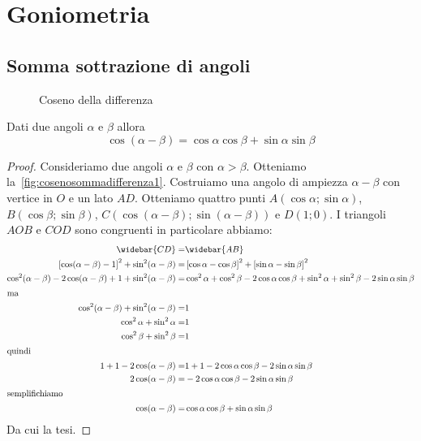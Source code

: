 \chapter{Goniometria}
\section{Somma sottrazione di angoli}
\begin{figure}
	\centering

	\caption{Coseno della differenza}
	\label{fig:cosenosommadifferenza1}
\end{figure}
\begin{thm}\label{thm:Cosenodelladifferenza}
Dati due angoli $\alpha$ e $\beta$ allora
\[\cos(\alpha-\beta)=\cos\alpha\cos\beta+\sin\alpha\sin\beta  \]
\end{thm}
\begin{proof}
Consideriamo due angoli $\alpha$ e $\beta$ con $\alpha>\beta$. Otteniamo la~\vref{fig:cosenosommadifferenza1}. Costruiamo una angolo di ampiezza $\alpha-\beta$ con vertice in $O$ e un lato $AD$. Otteniamo quattro punti $A(\cos\alpha;\sin\alpha)$, $B (\cos\beta;\sin\beta)$, $C(\cos\left(\alpha-\beta\right);\sin\left(\alpha-\beta\right))$ e $D(1;0)$. I triangoli $AOB$ e $COD$ sono congruenti in particolare abbiamo: \begin{align*}
\widebar{CD}=&\widebar{AB}\\
\left[\cos(\alpha-\beta)-1\right]^2+\sin^2(\alpha-\beta)=&\left[\cos\alpha-\cos\beta\right]^2+\left[\sin\alpha-\sin\beta\right]^2\\
\cos^2(\alpha-\beta)-2\cos(\alpha-\beta)+1+\sin^2(\alpha-\beta)=&\cos^2\alpha+\cos^2\beta-2\cos\alpha\cos\beta+\sin^2\alpha+\sin^2\beta-2\sin\alpha\sin\beta\\
\intertext{ma}
\cos^2(\alpha-\beta)+\sin^2(\alpha-\beta)=&1\\
\cos^2\alpha+\sin^2\alpha=&1\\
\cos^2\beta+\sin^2\beta=&1\\
\intertext{quindi}
1+1-2\cos(\alpha-\beta)=&1+1-2\cos\alpha\cos\beta-2\sin\alpha\sin\beta\\
2\cos(\alpha-\beta)=&-2\cos\alpha\cos\beta-2\sin\alpha\sin\beta\\
\intertext{semplifichiamo}
\cos(\alpha-\beta)=&\cos\alpha\cos\beta+\sin\alpha\sin\beta 
\end{align*}
Da cui la tesi.
\end{proof}

